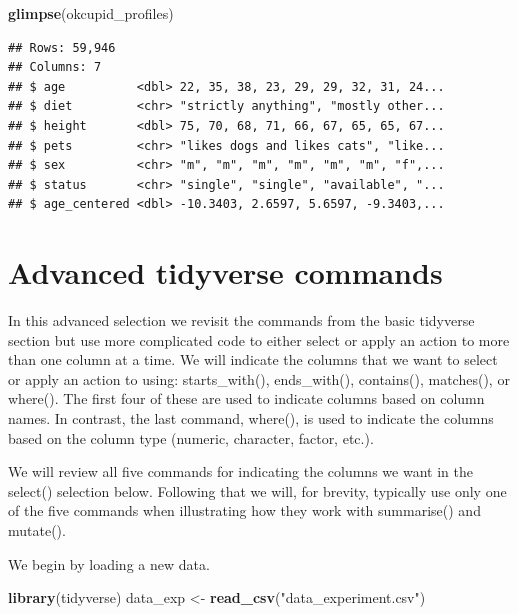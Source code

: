 \documentclass[
]{krantz}
\makeatletter
\newenvironment{Shaded}{\begin{snugshade}}{\end{snugshade}}
\newcommand{\KeywordTok}[1]{\textcolor[rgb]{0.27,0.27,0.27}{\textbf{#1}}}
\newcommand{\NormalTok}[1]{#1}
\newcommand{\StringTok}[1]{\textcolor[rgb]{0.5,0.5,0.5}{#1}}
\newenvironment{kframe}{%
\medskip{}
\setlength{\fboxsep}{.8em}
 \def\at@end@of@kframe{}%
 \ifinner\ifhmode%
  \def\at@end@of@kframe{\end{minipage}}%
  \begin{minipage}{\columnwidth}%
 \fi\fi%
 \def\FrameCommand##1{\hskip\@totalleftmargin \hskip-\fboxsep
 \colorbox{shadecolor}{##1}\hskip-\fboxsep
     \hskip-\linewidth \hskip-\@totalleftmargin \hskip\columnwidth}%
 \MakeFramed {\advance\hsize-\width
   \@totalleftmargin\z@ \linewidth\hsize
   \@setminipage}}%
 {\par\unskip\endMakeFramed%
 \at@end@of@kframe}
\renewenvironment{Shaded}{\begin{kframe}}{\end{kframe}}
\makeatother
\begin{document}
\begin{Shaded}
\begin{Highlighting}[]
\KeywordTok{glimpse}\NormalTok{(okcupid_profiles)}
\end{Highlighting}
\end{Shaded}

\begin{verbatim}
## Rows: 59,946
## Columns: 7
## $ age          <dbl> 22, 35, 38, 23, 29, 29, 32, 31, 24...
## $ diet         <chr> "strictly anything", "mostly other...
## $ height       <dbl> 75, 70, 68, 71, 66, 67, 65, 65, 67...
## $ pets         <chr> "likes dogs and likes cats", "like...
## $ sex          <chr> "m", "m", "m", "m", "m", "m", "f",...
## $ status       <chr> "single", "single", "available", "...
## $ age_centered <dbl> -10.3403, 2.6597, 5.6597, -9.3403,...
\end{verbatim}

\hypertarget{advanced-tidyverse-commands}{%
\section{Advanced tidyverse commands}\label{advanced-tidyverse-commands}}

In this advanced selection we revisit the commands from the basic tidyverse section but use more complicated code to either select or apply an action to more than one column at a time. We will indicate the columns that we want to select or apply an action to using: starts\_with(), ends\_with(), contains(), matches(), or where(). The first four of these are used to indicate columns based on column names. In contrast, the last command, where(), is used to indicate the columns based on the column type (numeric, character, factor, etc.).

We will review all five commands for indicating the columns we want in the select() selection below. Following that we will, for brevity, typically use only one of the five commands when illustrating how they work with summarise() and mutate().

We begin by loading a new data.

\begin{Shaded}
\begin{Highlighting}[]
\KeywordTok{library}\NormalTok{(tidyverse)}
\NormalTok{data_exp <-}\StringTok{ }\KeywordTok{read_csv}\NormalTok{(}\StringTok{"data_experiment.csv"}\NormalTok{)}
\end{Highlighting}
\end{Shaded}
\end{document}
